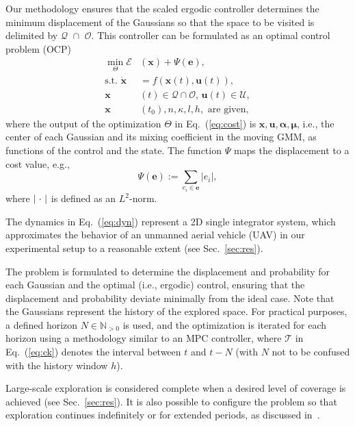 \documentclass[letterpaper,10pt,conference,twoside]{IEEEtran}
\theoremstyle{definition}
\begin{document}
Our methodology ensures that the scaled ergodic controller determines the minimum displacement of the Gaussians so that the space to be visited is delimited by $\mathcal{Q}\,\,\cap\,\,\mathcal{O}$. This controller can be formulated as an optimal control problem (OCP) 
\begin{subequations}\label{eq:ocp}\begin{align}
  \min_{\Theta}%
  \mathcal{E}&(\mathbf{x})+\Psi(\mathbf{e}),\label{eq:cost}\\
  \text{s.t. }\dot{\mathbf{x}}&=f(\mathbf{x}(t),\mathbf{u}(t)),\label{eq:dyn}\\
  \mathbf{x}&(t)\in\mathcal{Q}\cap\mathcal{O},\,\mathbf{u}(t)\in\mathcal{U},\label{eq:const}\\
  \mathbf{x}&(t_0),n,\kappa,l,h,\text{ are given},\label{eq:ocpconsttotf}
\end{align}\end{subequations}
where the output of the optimization $\Theta$ in Eq.~(\ref{eq:cost}) is $\mathbf{x},\mathbf{u},\boldsymbol{\alpha},\boldsymbol{\mu}$, i.e., the center of each Gaussian and its mixing coefficient in the moving GMM, as functions of the control and the state. The function $\Psi$ maps the displacement to a cost value, e.g., 
\begin{equation}
  \Psi(\mathbf{e}):=\sum_{e_i\in\mathbf{e}}|e_i|,
\end{equation}
where $|\hspace{.2ex}\cdot\hspace{.2ex}|$ is defined as an $L^2$-norm.

The dynamics in Eq.~(\ref{eq:dyn}) represent a 2D single integrator system, which approximates the behavior of an unmanned aerial vehicle (UAV) in our experimental setup to a reasonable extent (see Sec.~\ref{sec:res}).

The problem is formulated to determine the displacement and probability for each Gaussian and the optimal (i.e., ergodic) control, ensuring that the displacement and probability deviate minimally from the ideal case. Note that the Gaussians represent the history of the explored space. For practical purposes, a defined horizon $N \in \mathbb{N}_{>0}$ is used, and the optimization is iterated for each horizon using a methodology similar to an MPC controller, where $\mathcal{T}$ in Eq.~(\ref{eq:ck}) denotes the interval between $t$ and $t-N$ (with $N$ not to be confused with the history window $h$).

Large-scale exploration is considered complete when a desired level of coverage is achieved (see Sec.~\ref{sec:res}). It is also possible to configure the problem so that exploration continues indefinitely or for extended periods, as discussed in~\cite{seewald2024energy}. 
\end{document}
